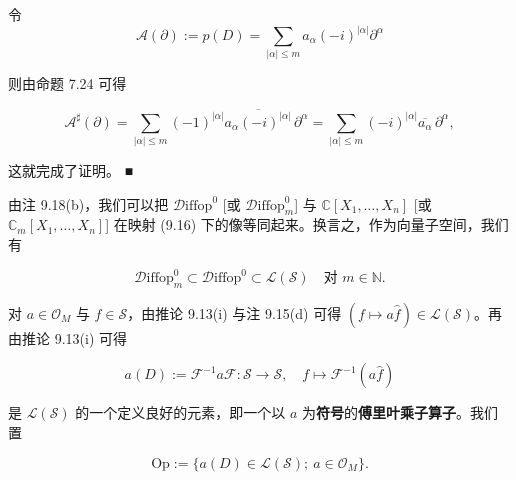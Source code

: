 \begin{remark}
\begin{items}
\proofhead
令
\[
\mathcal{A}(\partial) := p(D) = \sum_{|\alpha| \le m} a_\alpha (-i)^{|\alpha|} \partial^\alpha
\]

则由命题 7.24 可得

\[
\mathcal{A}^{\sharp}(\partial) = \sum_{|\alpha| \le m} (-1)^{|\alpha|} \overline{a_\alpha (-i)^{|\alpha|}}\, \partial^\alpha = \sum_{|\alpha| \le m} (-i)^{|\alpha|} \overline{a_\alpha}\, \partial^\alpha ,
\]

这就完成了证明。 \nobreak\hspace{0.35em}■

\end{items}

由注 9.18(b)，我们可以把 $ \mathcal{D}\mathrm{iffop}^0 $ [或 $ \mathcal{D}\mathrm{iffop}^0_m $] 与 $ \mathbb{C}[X_1,\ldots,X_n] $ [或 $ \mathbb{C}_m[X_1,\ldots,X_n] $] 在映射 (9.16) 下的像等同起来。换言之，作为向量子空间，我们有

\[
\mathcal{D}\mathrm{iffop}^0_m \subset \mathcal{D}\mathrm{iffop}^0 \subset \mathcal{L}(\mathcal{S}) \quad \text{对 } m \in \mathbb{N} .
\]

对 $ a \in \mathcal{O}_M $ 与 $ f \in \mathcal{S} $，由推论 9.13(i) 与注 9.15(d) 可得 $ (f \mapsto a\hat{f}) \in \mathcal{L}(\mathcal{S}) $。再由推论 9.13(i) 可得

\[
a(D) := \mathcal{F}^{-1}a\mathcal{F}: \mathcal{S} \to \mathcal{S} , \quad f \mapsto \mathcal{F}^{-1}(a\hat{f})
\]

是 $ \mathcal{L}(\mathcal{S}) $ 的一个定义良好的元素，即一个以 $ a $ 为\textbf{符号}的\textbf{傅里叶乘子算子}。我们置

\[
\mathrm{Op} := \{ a(D) \in \mathcal{L}(\mathcal{S}) ;\ a \in \mathcal{O}_M \} .
\]
\end{remark}

